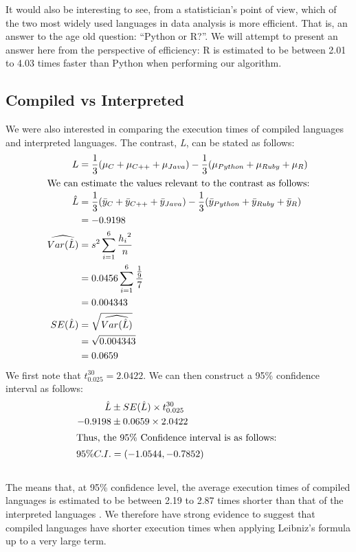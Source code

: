\documentclass[12pt,halfline,a4paper,]{ouparticle}
\begin{document}
It would also be interesting to see, from a statistician's point of
view, which of the two most widely used languages in data analysis is
more efficient. That is, an answer to the age old question: ``Python or
R?''. We will attempt to present an answer here from the perspective of
efficiency: R is estimated to be between 2.01 to 4.03 times faster than
Python when performing our algorithm.

\subsection{Compiled vs Interpreted}\label{compiled-vs-interpreted}

We were also interested in comparing the execution times of compiled
languages and interpreted languages. The contrast, \emph{L}, can be
stated as follows: \begin{align*}
L &= \frac{1}{3} (\mu_C + \mu_{C++} + \mu_{Java}) - \frac{1}{3}(\mu_{Python} + \mu_{Ruby} + \mu_{R})\\
\intertext{We can estimate the values relevant to the contrast as follows:}
\hat{L} &= \frac{1}{3} (\bar{y}_C + \bar{y}_{C++} + \bar{y}_{Java}) - \frac{1}{3}(\bar{y}_{Python} + \bar{y}_{Ruby} + \bar{y}_{R})\\
&= -0.9198 \\
\widehat{Var(\hat{L})} &= s^{2} \sum_{i=1}^{6} \frac{{h_i}^2}{n}\\
&= 0.0456\sum_{i=1}^{6}\frac{\frac{1}{9}}{7}\\
&= 0.004343\\
SE(\hat{L}) &= \sqrt{\widehat{Var(\hat{L})}}\\
 &= \sqrt{0.004343}\\
 &= 0.0659
\end{align*} We first note that \(t_{0.025}^{30} = 2.0422\). We can then
construct a 95\% confidence interval as follows: \begin{align*}
\hat{L}&\pm SE(\hat{L})\times t_{0.025}^{30}\\
-0.9198 &\pm 0.0659 \times 2.0422\\
\intertext{Thus, the 95\% Confidence interval is as follows: }
95\%C.I. &= (-1.0544 ,-0.7852)
\end{align*}\\
The means that, at 95\% confidence level, the average execution times of
compiled languages is estimated to be between 2.19 to 2.87 times shorter
than that of the interpreted languages . We therefore have strong
evidence to suggest that compiled languages have shorter execution times
when applying Leibniz's formula up to a very large term. \newpage
\end{document}
